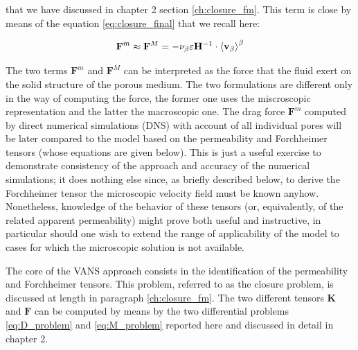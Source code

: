 that we have discussed in chapter 2 section \ref{ch:closure_fm}. This term is close by means of the equation \eqref{eq:closure_final} that we recall here:

\begin{equation}
\mathbf{F}^m \approx \mathbf{F}^M = - \nu_{\beta} \varepsilon \mathbf{H}^{-1} \cdot {\left< \textbf{v}_{\beta}\right>}^{\beta}
\label{eq:closure_model}
\end{equation}



The two terms $\mathbf{F}^m$ and $\mathbf{F}^M$ can be interpreted as the force that the fluid exert on the solid structure of the porous medium. The two formulations are different only in the way of computing the force, the former one uses the miscroscopic representation and the latter the macroscopic one.
The drag force $\mathbf{F}^{\textit{m}}$ computed by direct numerical simulations (DNS) with account of all individual pores will be later compared to the model based on the permeability and Forchheimer tensors (whose equations are given below).
This is just a useful exercise to demonstrate consistency of the approach and accuracy of the numerical simulations; it does nothing else since, as briefly described below, to derive the Forchheimer tensor the microscopic velocity field must be known anyhow.  Nonetheless, knowledge of the behavior of these tensors (or, equivalently, of the related apparent permeability) might prove both useful and instructive, in particular should one wish to extend the range of applicability of the model to cases for which the microscopic solution is not available.

The core of the VANS approach consists in the identification of the permeability and Forchheimer tensors. This problem, referred to as the closure problem, is discussed at length in paragraph \ref{ch:closure_fm}.
The two different tensors $\mathbf{K}$ and $\mathbf{F}$  can be computed by means by the two differential problems \eqref{eq:D_problem} and \eqref{eq:M_problem} reported here and discussed in detail in chapter 2.

